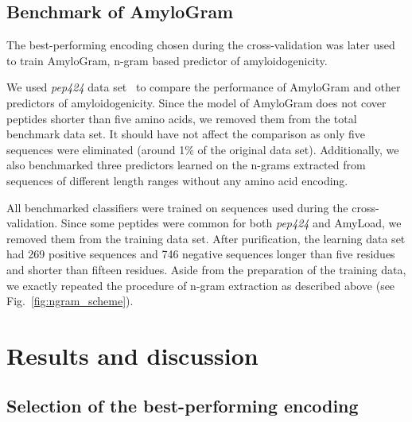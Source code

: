 \documentclass[a4,center,fleqn]{NAR}
\begin{document}
\subsection{Benchmark of AmyloGram}

The best-performing encoding chosen during the cross-validation was later used 
to train AmyloGram, n-gram based predictor of amyloidogenicity.

  We used \textit{pep424} data set~\citep{walsh_pasta_2014} to compare the 
performance of AmyloGram and other predictors of amyloidogenicity. Since the 
model of AmyloGram does not cover peptides shorter than five amino acids, we 
removed them from the total benchmark data set. It should have not affect the 
comparison as only five sequences were eliminated (around 1\% of the original 
data set). Additionally, we also benchmarked three predictors learned on the 
n-grams extracted from sequences of different length ranges without any amino 
acid encoding.

  All benchmarked classifiers were trained on sequences used during the 
cross-validation. Since some peptides were common for both \textit{pep424} and 
AmyLoad, we removed them from the training data set. After purification, the 
learning data set had 269 positive sequences and 746 negative sequences longer 
than five residues and shorter than fifteen residues. Aside from the 
preparation of the training data, we exactly repeated the procedure of n-gram 
extraction as described above (see Fig.~\ref{fig:ngram_scheme}).

\section{Results and discussion}

\subsection{Selection of the best-performing encoding}
\end{document}
